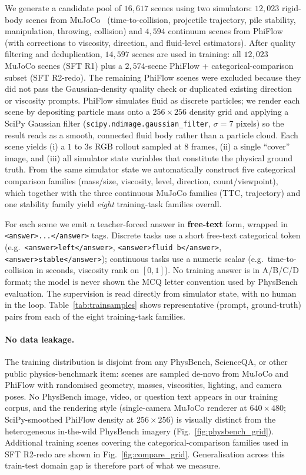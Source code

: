 \documentclass{article}
\begin{document}
We generate a candidate pool of $16{,}617$ scenes using two
simulators: $12{,}023$ rigid-body scenes from
MuJoCo~\cite{mujoco2012} (time-to-collision, projectile trajectory,
pile stability, manipulation, throwing, collision) and $4{,}594$
continuum scenes from PhiFlow~\cite{phiflow2020} (with corrections
to viscosity, direction, and fluid-level estimators). After quality
filtering and deduplication, $14{,}597$ scenes are used in
training: all $12{,}023$ MuJoCo scenes (SFT R1) plus a
$2{,}574$-scene PhiFlow + categorical-comparison subset (SFT
R2-redo). The remaining PhiFlow scenes were excluded because they did
not pass the Gaussian-density quality check or duplicated existing
direction or viscosity prompts. PhiFlow simulates fluid as discrete particles;
we render each scene by depositing particle mass onto a
$256{\times}256$ density grid and applying a SciPy Gaussian filter
(\texttt{scipy.ndimage.gaussian\_filter}, $\sigma=7$ pixels) so the
result reads as a smooth, connected fluid body rather than a
particle cloud. Each scene yields (i) a $1$ to $3$s RGB rollout
sampled at $8$ frames, (ii) a single ``cover'' image, and (iii) all
simulator state variables that constitute the physical ground
truth. From the same simulator state we automatically construct
five categorical comparison families (mass/size, viscosity, level,
direction, count/viewpoint), which together with the three
continuous MuJoCo families (TTC, trajectory) and one stability family
yield \emph{eight} training-task families overall.

For each scene we emit a teacher-forced answer in
\textbf{free-text} form, wrapped in
\texttt{<answer>...</answer>} tags. Discrete tasks use a short
free-text categorical token (e.g.\ \texttt{<answer>left</answer>},
\texttt{<answer>fluid b</answer>}, \texttt{<answer>stable</answer>});
continuous tasks use a numeric scalar (e.g.\ time-to-collision in
seconds, viscosity rank on $[0,1]$). No training answer is in
A/B/C/D format; the model is never shown the MCQ letter convention
used by PhysBench evaluation. The supervision is read
directly from simulator state, with no human in the loop.
Table~\ref{tab:trainsamples} shows representative (prompt,
ground-truth) pairs from each of the eight training-task families.

\paragraph{No data leakage.} The training distribution is disjoint
from any PhysBench, ScienceQA, or other public physics-benchmark
item: scenes are sampled de-novo from MuJoCo and PhiFlow with
randomised geometry, masses, viscosities, lighting, and camera
poses. No PhysBench image, video, or question text appears in our
training corpus, and the rendering style (single-camera MuJoCo
renderer at $640{\times}480$; SciPy-smoothed PhiFlow density at
$256{\times}256$) is visually distinct from the heterogeneous
in-the-wild PhysBench imagery (Fig.~\ref{fig:physbench_grid}).
Additional training scenes covering the categorical-comparison
families used in SFT R2-redo are shown in Fig.~\ref{fig:compare_grid}.
Generalisation across this train-test domain gap is therefore part
of what we measure.
\end{document}
